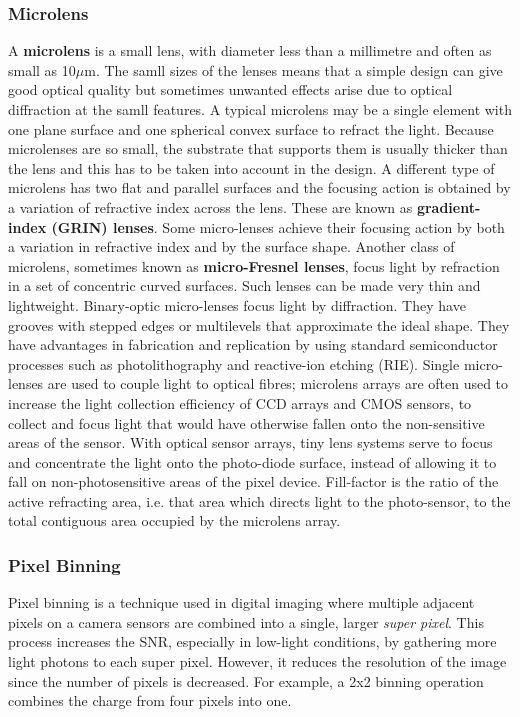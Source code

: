 \subsubsection{Microlens}
A \textbf{microlens} is a small lens, with diameter less than a millimetre and often as small as 10$\mu$m. The samll sizes of the lenses means that a simple design can give good optical quality but sometimes unwanted effects arise due to optical diffraction at the samll features. A typical microlens may be a single element with one plane surface and one spherical convex surface to refract the light.
Because microlenses are so small, the substrate that supports them is usually thicker than the lens and this has to be taken into account in the design.
\nl
A different type of microlens has two flat and parallel surfaces and the focusing action is obtained by a variation of refractive index across the lens. These are known as \textbf{gradient-index (GRIN) lenses}. Some micro-lenses achieve their focusing action by both a variation in refractive index and by the surface shape.
\nl
Another class of microlens, sometimes known as \textbf{micro-Fresnel lenses}, focus light by refraction in a set of concentric curved surfaces. Such lenses can be made very thin and lightweight. Binary-optic micro-lenses focus light by diffraction. They have grooves with stepped edges or multilevels that approximate the ideal shape. They have advantages in fabrication and replication by using standard semiconductor processes such as photolithography and reactive-ion etching (RIE).
\nl
Single micro-lenses are used to couple light to optical fibres; microlens arrays are often used to increase the light collection efficiency of CCD arrays and CMOS sensors, to collect and focus light that would have otherwise fallen onto the non-sensitive areas of the sensor.
\nl
With optical sensor arrays, tiny lens systems serve to focus and concentrate the light onto the photo-diode surface, instead of allowing it to fall on non-photosensitive areas of the pixel device. Fill-factor is the ratio of the active refracting area, i.e. that area which directs light to the photo-sensor, to the total contiguous area occupied by the microlens array.

\subsubsection{Pixel Binning}
Pixel binning is a technique used in digital imaging where multiple adjacent pixels on a camera sensors are combined into a single, larger \textit{super pixel}. This process increases the SNR, especially in low-light conditions, by gathering more light photons to each super pixel. However, it reduces the resolution of the image since the number of pixels is decreased.
For example, a 2x2 binning operation combines the charge from four pixels into one.

